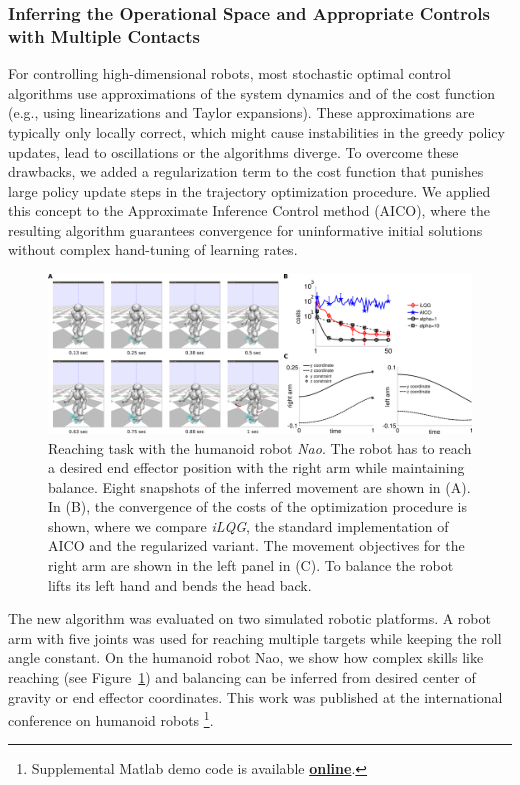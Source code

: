 \documentclass[final,5p,twocolumn]{elsarticle}
\begin{document}
\subsubsection{Inferring the Operational Space and Appropriate Controls with Multiple Contacts}

For controlling high-dimensional robots, most stochastic optimal control
algorithms use approximations of the system dynamics and of the cost function
(e.g., using linearizations and Taylor expansions). These approximations are
typically only locally correct, which might cause instabilities in the greedy
policy updates, lead to oscillations or the algorithms diverge. To overcome
these drawbacks, we added a regularization term to the cost function that punishes
large policy update steps in the trajectory optimization procedure. We applied
this concept to the Approximate Inference Control method (AICO), where the
resulting algorithm guarantees convergence for uninformative initial solutions
without complex hand-tuning of learning rates. 

\begin{figure}[t]
  \begin{center}
  \includegraphics[width=\linewidth]{./sections/WP4/pics_elmar/NaoReachingTask.png}
  \end{center}
  \caption{Reaching task with the humanoid robot \textit{Nao}. The robot has to
reach  a desired end effector position with the right arm while maintaining
balance. Eight snapshots of the inferred movement are shown in (A). In (B), the
convergence of the costs of the optimization procedure is shown, where we
compare \textit{iLQG}, the standard implementation of AICO and the regularized
variant. The movement objectives for the right arm are shown in the left panel
in (C). To balance the robot lifts its left hand and bends the head back.}
  \label{fig:naoReachingTask}
  \end{figure}

The new algorithm was evaluated on
two simulated robotic platforms. A robot arm with five joints was used for
reaching multiple targets while keeping the roll angle constant. On the humanoid
robot Nao, we show how complex skills like reaching (see Figure~\ref{fig:naoReachingTask}) and balancing can be
inferred from desired center of gravity or end effector coordinates. This work was published at 
the international conference on humanoid robots \cite{Rueckert2014}\footnote{Supplemental Matlab demo code is available \href{http://www.ausy.tu-darmstadt.de/Team/ElmarRueckert}{\textbf{online}}.}. 
\end{document}
